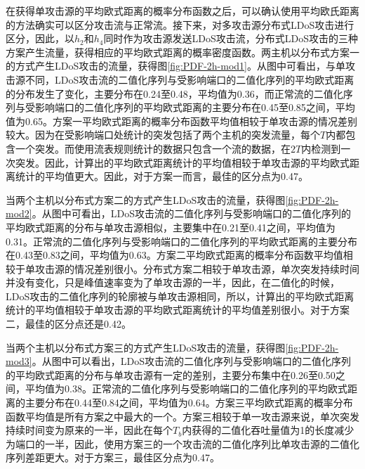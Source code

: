 
在获得单攻击源的平均欧式距离的概率分布函数之后，可以确认使用平均欧氏距离的方法确实可以区分攻击流与正常流。接下来，对多攻击源分布式LDoS攻击进行区分，因此，以$h_2$和$h_4$同时作为攻击源发送LDoS攻击流，分布式LDoS攻击的三种方案产生流量，获得相应的平均欧式距离的概率密度函数。两主机以分布式方案一的方式产生LDoS攻击的流量，获得图\ref{fig:PDF-2h-mod1}。从图中可看出，与单攻击源不同，LDoS攻击流的二值化序列与受影响端口的二值化序列的平均欧式距离的分布发生了变化，主要分布在0.24至0.48，平均值为0.36，而正常流的二值化序列与受影响端口的二值化序列的平均欧式距离的主要分布在0.45至0.85之间，平均值为0.65。方案一平均欧式距离的概率分布函数平均值相较于单攻击源的情况差别较大。因为在受影响端口处统计的突发包括了两个主机的突发流量，每个$T$内都包含一个突发。而使用流表规则统计的数据只包含一个流的数据，在$2T$内检测到一次突发。因此，计算出的平均欧式距离统计的平均值相较于单攻击源的平均欧式距离统计的平均值更大。因此，对于方案一而言，最佳的区分点为0.47。

当两个主机以分布式方案二的方式产生LDoS攻击的流量，获得图\ref{fig:PDF-2h-mod2}。从图中可看出，LDoS攻击流的二值化序列与受影响端口的二值化序列的平均欧式距离的分布与单攻击源相似，主要集中在0.21至0.41之间，平均值为0.31。正常流的二值化序列与受影响端口的二值化序列的平均欧式距离的主要分布在0.43至0.83之间，平均值为0.63。方案二平均欧式距离的概率分布函数平均值相较于单攻击源的情况差别很小。分布式方案二相较于单攻击源，单次突发持续时间并没有变化，只是峰值速率变为了单攻击源的一半，因此，在二值化的时候，LDoS攻击的二值化序列的轮廓被与单攻击源相同，所以，计算出的平均欧式距离统计的平均值相较于单攻击源的平均欧式距离统计的平均值差别很小。对于方案二，最佳的区分点还是0.42。

当两个主机以分布式方案三的方式产生LDoS攻击的流量，获得图\ref{fig:PDF-2h-mod3}。从图中可以看出，LDoS攻击流的二值化序列与受影响端口的二值化序列的平均欧式距离的分布与单攻击源有一定的差别，主要分布集中在0.26至0.50之间，平均值为0.38。正常流的二值化序列与受影响端口的二值化序列的平均欧式距离的主要分布在0.44至0.84之间，平均值为0.64。方案三平均欧式距离的概率分布函数平均值是所有方案之中最大的一个。方案三相较于单一攻击源来说，单次突发持续时间变为原来的一半，因此在每个$T_b$内获得的二值化吞吐量值为1的长度减少为端口的一半，因此，使用方案三的一个攻击流的二值化序列比单攻击源的二值化序列差距更大。对于方案三，最佳区分点为0.47。


